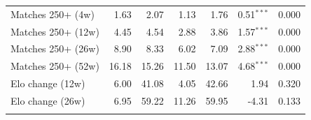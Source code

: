 \begin{tabular}{l rr rr rr}
\quad Matches 250+ (4w) & 1.63 & 2.07 & 1.13 & 1.76 & 0.51$^{***}$ & 0.000 \\
\quad Matches 250+ (12w) & 4.45 & 4.54 & 2.88 & 3.86 & 1.57$^{***}$ & 0.000 \\
\quad Matches 250+ (26w) & 8.90 & 8.33 & 6.02 & 7.09 & 2.88$^{***}$ & 0.000 \\
\quad Matches 250+ (52w) & 16.18 & 15.26 & 11.50 & 13.07 & 4.68$^{***}$ & 0.000 \\
\quad Elo change (12w) & 6.00 & 41.08 & 4.05 & 42.66 & 1.94 & 0.320 \\
\quad Elo change (26w) & 6.95 & 59.22 & 11.26 & 59.95 & -4.31 & 0.133 \\
\addlinespace
\bottomrule
\end{tabular}
